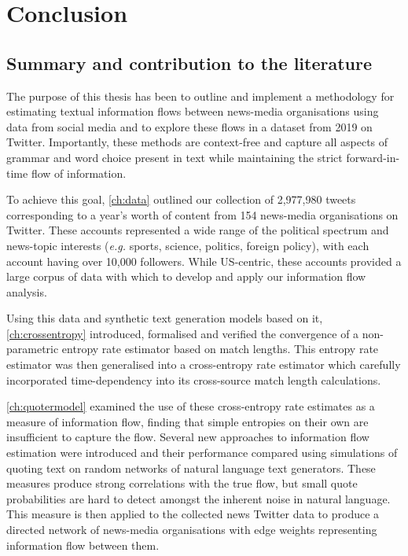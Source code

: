 \chapter{Conclusion}\label{ch:conclusion}

\section{Summary and contribution to the literature}


The purpose of this thesis has been to outline and implement a methodology for estimating textual information flows between news-media organisations using data from social media and to explore these flows in a dataset from 2019 on Twitter. Importantly, these methods are context-free and capture all aspects of grammar and word choice present in text while maintaining the strict forward-in-time flow of information.

To achieve this goal, \autoref{ch:data} outlined our collection of 2,977,980 tweets corresponding to a year's worth of content from 154 news-media organisations on Twitter. These accounts represented a wide range of the political spectrum and news-topic interests (\emph{e.g.} sports, science, politics, foreign policy), with each account having over 10,000 followers. While US-centric, these accounts provided a large corpus of data with which to develop and apply our information flow analysis.

Using this data and synthetic text generation models based on it, \autoref{ch:crossentropy} introduced, formalised and verified the convergence of a non-parametric entropy rate estimator based on match lengths. This entropy rate estimator was then generalised into a cross-entropy rate estimator which carefully incorporated time-dependency into its cross-source match length calculations. 

\autoref{ch:quotermodel} examined the use of these cross-entropy rate estimates as a measure of information flow, finding that simple entropies on their own are insufficient to capture the flow. Several new approaches to information flow estimation were introduced and their performance compared using simulations of quoting text on random networks of natural language text generators. These measures produce strong correlations with the true flow, but small quote probabilities are hard to detect amongst the inherent noise in natural language. This measure is then applied to the collected news Twitter data to produce a directed network of news-media organisations with edge weights representing information flow between them. 

